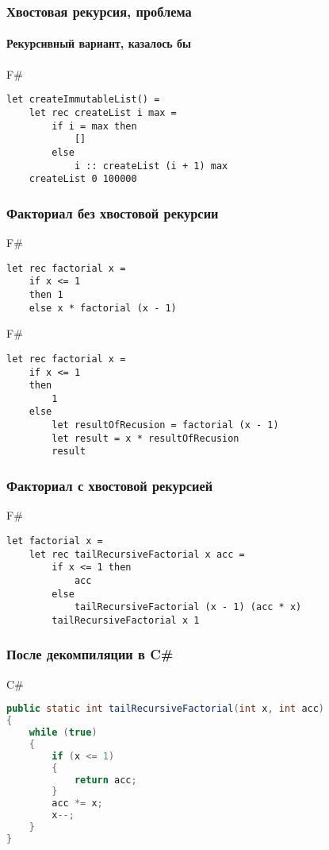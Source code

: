 \documentclass[xetex,mathserif,serif]{beamer}
\begin{document}
\begin{frame}[fragile]
	\frametitle{Хвостовая рекурсия, проблема}
	\framesubtitle{Рекурсивный вариант, казалось бы}
	\begin{exampleblock}{F\#}
		\begin{lstlisting}
let createImmutableList() =
    let rec createList i max =
        if i = max then
            []	
        else
            i :: createList (i + 1) max
    createList 0 100000
\end{lstlisting}
\end{exampleblock}
	
\end{frame}

\begin{frame}[fragile]
	\frametitle{Факториал без хвостовой рекурсии}
	\begin{exampleblock}{F\#}
		\begin{lstlisting}
let rec factorial x =
    if x <= 1
    then 1 
    else x * factorial (x - 1)
\end{lstlisting}
\end{exampleblock}
	
	\begin{exampleblock}{F\#}
		\begin{lstlisting}
let rec factorial x =
    if x <= 1
    then
        1
    else
        let resultOfRecusion = factorial (x - 1)
        let result = x * resultOfRecusion
        result
\end{lstlisting}
\end{exampleblock}
	
\end{frame}

\begin{frame}[fragile]
	\frametitle{Факториал с хвостовой рекурсией}
	\begin{exampleblock}{F\#}
		\begin{lstlisting}
let factorial x =
    let rec tailRecursiveFactorial x acc =
        if x <= 1 then
            acc
        else
            tailRecursiveFactorial (x - 1) (acc * x)
        tailRecursiveFactorial x 1
\end{lstlisting}
\end{exampleblock}

\end{frame}
	
\begin{frame}[fragile]
	\frametitle{После декомпиляции в C\#}
		\begin{alertblock}{C\#}
			\begin{lstlisting}[language=Java]
public static int tailRecursiveFactorial(int x, int acc)
{
    while (true)
    {
        if (x <= 1)
        {
            return acc;
        }
        acc *= x;
        x--;
    }
}
\end{lstlisting}
\end{alertblock}
	
\end{frame}
\end{document}
